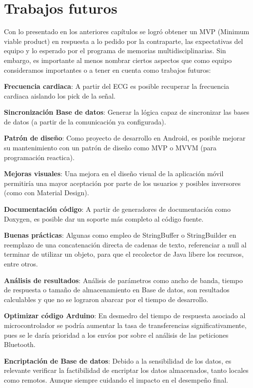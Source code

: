 \section{Trabajos futuros}

Con lo presentado en los anteriores capítulos se logró obtener un MVP (Minimum viable product) en respuesta a lo pedido por la contraparte, las expectativas del equipo y lo esperado por el programa de memorias multidisciplinarias. Sin embargo, es importante al menos nombrar ciertos aspectos que como equipo consideramos importantes o a tener en cuenta como trabajos futuros:

\textbf{Frecuencia cardiaca}: A partir del ECG es posible recuperar la frecuencia cardiaca aislando los pick de la señal.

\textbf{Sincronización Base de datos}: Generar la lógica capaz de sincronizar las bases de datos (a partir de la comunicación ya configurada).

\textbf{Patrón de diseño}: Como proyecto de desarrollo en Android, es posible mejorar su mantenimiento con un patrón de diseño como MVP o MVVM (para programación reactica).

\textbf{Mejoras visuales}: Una mejora en el diseño visual de la aplicación móvil permitiría una mayor aceptación por parte de los usuarios y posibles inversores (como con Material Design).

\textbf{Documentación código}: A partir de generadores de documentación como Doxygen, es posible dar un soporte más completo al código fuente.

\newpage

\textbf{Buenas prácticas}: Algunas como empleo de StringBuffer o StringBuilder en reemplazo de una concatenación directa de cadenas de texto, referenciar a null al terminar de utilizar un objeto, para que el recolector de Java libere los recursos, entre otros.

\textbf{Análisis de resultados}: Análisis de parámetros como ancho de banda, tiempo de respuesta o tamaño de almacenamiento en Base de datos, son resultados calculables y que no se lograron abarcar por el tiempo de desarrollo.

\textbf{Optimizar código Arduino}: En desmedro del tiempo de respuesta asociado al microcontrolador se podría aumentar la tasa de transferencias significativamente, pues se le daría prioridad a los envíos por sobre el análisis de las peticiones Bluetooth.

\textbf{Encriptación de Base de datos}: Debido a la sensibilidad de los datos, es relevante verificar la factibilidad de encriptar los datos almacenados, tanto locales como remotos. Aunque siempre cuidando el impacto en el desempeño final.


